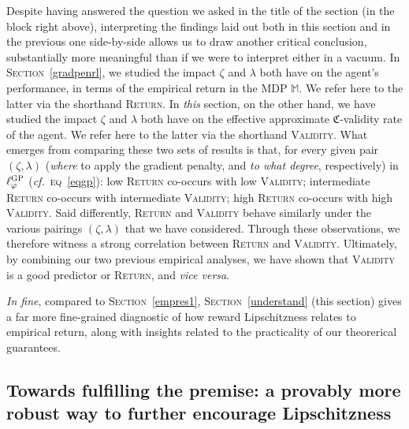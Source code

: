 Despite having answered the question we asked in the title of the section (in the block right above),
interpreting the findings laid out both in this section and in the previous one side-by-side
allows us to draw another critical conclusion, substantially more meaningful than
if we were to interpret either in a vacuum.
In \textsc{Section}~\ref{gradpenrl}, we studied the impact $\zeta$ and $\lambda$
both have on the agent's performance, in terms of the empirical return in the MDP $\mathbb{M}$.
We refer here to the latter via the shorthand \textsc{Return}.
In \emph{this} section, on the other hand, we have studied the impact $\zeta$ and $\lambda$
both have on the effective approximate $\mathfrak{C}$-validity rate of the agent.
We refer here to the latter via the shorthand \textsc{Validity}.
What emerges from comparing these two sets of results is that, for every given pair $(\zeta,\lambda)$
(\emph{where} to apply the gradient penalty, and \emph{to what degree}, respectively)
in $\ell_\varphi^\textsc{GP}$ (\textit{cf.}~\textsc{eq}~\ref{eqgp}):
low \textsc{Return} co-occurs with low \textsc{Validity};
intermediate \textsc{Return} co-occurs with intermediate \textsc{Validity};
high \textsc{Return} co-occurs with high \textsc{Validity}.
Said differently, \textsc{Return} and \textsc{Validity} behave similarly under the various
pairings $(\zeta,\lambda)$ that we have considered.
Through these observations, we therefore witness a strong correlation between
\textsc{Return} and \textsc{Validity}.
Ultimately, by combining our two previous empirical analyses,
we have shown that \textsc{Validity} is a good predictor or \textsc{Return},
and \textit{vice versa}.

\textit{In fine}, compared to \textsc{Section}~\ref{empres1}, \textsc{Section}~\ref{understand} (this section)
gives a far more fine-grained diagnostic of how reward Lipschitzness relates to empirical return,
along with insights related to the practicality of our theorerical guarantees.

\subsection[%
A provably more robust way to further encourage Lipschitzness]{%
Towards fulfilling the premise: a provably more robust way to further encourage Lipschitzness}
\label{purpleandres}


